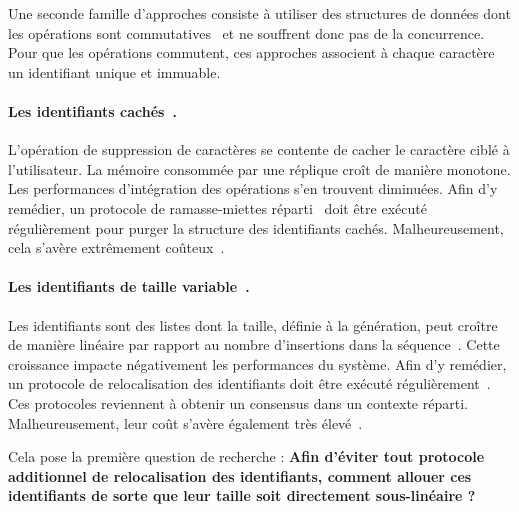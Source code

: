 Une seconde famille d'approches consiste à utiliser des structures de données
dont les opérations sont commutatives~\cite{shapiro2011conflict} et ne souffrent
donc pas de la concurrence. Pour que les opérations commutent, ces approches
associent à chaque caractère un identifiant unique et immuable.

\paragraph{Les identifiants cachés~\cite{oster2006data}.} L'opération de
suppression de caractères se contente de cacher le caractère ciblé à
l'utilisateur. La mémoire consommée par une réplique croît de manière
monotone. Les performances d'intégration des opérations s'en trouvent
diminuées. Afin d'y remédier, un protocole de ramasse-miettes
réparti~\cite{abdullahi1998garbage} doit être exécuté régulièrement pour purger
la structure des identifiants cachés. Malheureusement, cela s'avère extrêmement
coûteux~\cite{abdullahi1998garbage}.

\paragraph{Les identifiants de taille variable~\cite{weiss2009logoot}.} Les
identifiants sont des listes dont la taille, définie à la génération, peut
croître de manière linéaire par rapport au nombre d'insertions dans la
séquence~\cite{weiss2009logoot}. Cette croissance impacte négativement les
performances du système. Afin d'y remédier, un protocole de relocalisation des
identifiants doit être exécuté régulièrement~\cite{zawirskiasynchronous}. Ces
protocoles reviennent à obtenir un consensus dans un contexte
réparti. Malheureusement, leur coût s'avère également très
élevé~\cite{mostefaoui2015signature}.

Cela pose la première question de recherche : \textbf{Afin d'éviter tout
  protocole additionnel de relocalisation des identifiants, comment allouer ces
  identifiants de sorte que leur taille soit directement sous-linéaire ?}

